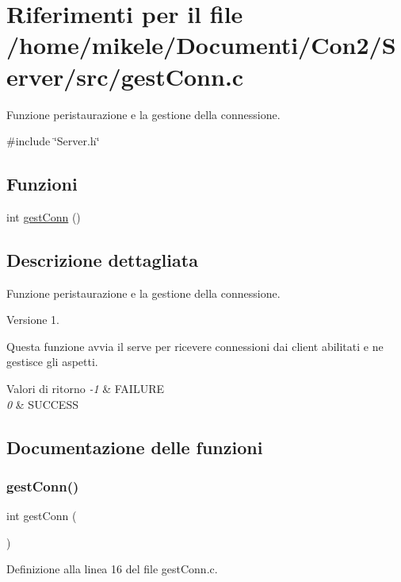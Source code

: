 \hypertarget{a00014}{}\section{Riferimenti per il file /home/mikele/\+Documenti/\+Con2/\+Server/src/gest\+Conn.c}
\label{a00014}


Funzione per\textquotesingle{}istaurazione e la gestione della connessione.  


{\ttfamily \#include \char`\"{}Server.\+h\char`\"{}}\newline
\subsection*{Funzioni}
\begin{DoxyCompactItemize}
\item 
int \mbox{\hyperlink{a00014_aee8d8f7af88ed9ef270a00e96a976e30}{gest\+Conn}} ()
\end{DoxyCompactItemize}


\subsection{Descrizione dettagliata}
Funzione per\textquotesingle{}istaurazione e la gestione della connessione. 

\begin{DoxyVersion}{Versione}
1.
\end{DoxyVersion}
Questa funzione avvia il serve per ricevere connessioni dai client abilitati e ne gestisce gli aspetti.


\begin{DoxyRetVals}{Valori di ritorno}
{\em -\/1} & F\+A\+I\+L\+U\+RE \\
\hline
{\em 0} & S\+U\+C\+C\+E\+SS \\
\hline
\end{DoxyRetVals}


\subsection{Documentazione delle funzioni}
\mbox{\label{a00014_aee8d8f7af88ed9ef270a00e96a976e30}} 
\subsubsection{\texorpdfstring{gestConn()}{gestConn()}}
{\footnotesize\ttfamily int gest\+Conn (\begin{DoxyParamCaption}{ }\end{DoxyParamCaption})}



Definizione alla linea 16 del file gest\+Conn.\+c.

